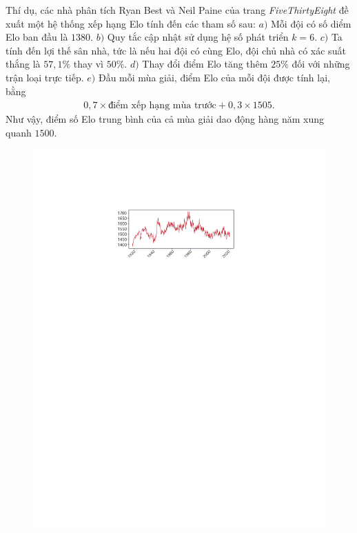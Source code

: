 \begin{multicols}{2}
	\vskip 0.05cm
	Thí dụ, các nhà phân tích Ryan Best và Neil Paine của trang \textit{FiveThirtyEight} đề xuất một hệ thống xếp hạng Elo tính đến các tham số sau:
	\vskip 0.05cm
	$a)$ Mỗi đội có số diểm Elo ban đầu là $1380$.
	\vskip 0.05cm
	$b)$ Quy tắc cập nhật sử dụng hệ số phát triển $k = 6$.
	\vskip 0.05cm
	$c)$ Ta tính đến lợi thế sân nhà, tức là nếu hai đội có cùng Elo, đội chủ nhà có xác suất thắng là $57{,}1\%$ thay vì $50\%$.
	\vskip 0.05cm
	$d)$ Thay đổi điểm Elo tăng thêm $25\%$ đối với những trận loại trực tiếp.
	\vskip 0.05cm
	$e)$ Đầu mỗi mùa giải, điểm Elo của mỗi đội được tính lại, bằng
	\begin{align*}
		0{,}7 \!\times\!\text{điểm xếp hạng mùa trước} + 0{,}3 \!\times\!\! 1505.
	\end{align*}
	Như vậy, điểm số Elo trung bình của cả mùa giải dao động hàng năm xung quanh $1500$.
	\begin{figure}[H]
		\vspace*{-5pt}
		\centering
		\captionsetup{labelformat= empty, justification=centering}
		\includegraphics[width= 1\linewidth]{pic3}

\end{figure}
\end{multicols}

